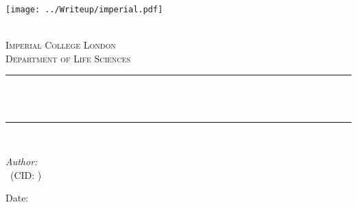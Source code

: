 \begin{titlepage}

    \newcommand{\HRule}{\rule{\linewidth}{0.5mm}} %
    
    
    \texttt{[image: ../Writeup/imperial.pdf]}\\[0.6cm] 
    
    \begin{center} %
    
    \textsc{\LARGE \reporttype}\\[1.5cm] 
    \textsc{\Large Imperial College London}\\[0.5cm] 
    \textsc{\large Department of Life Sciences}\\[0.5cm] 
    
    \HRule \\[0.4cm]
    { \huge \bfseries \reporttitle}\\ %
    \HRule \\[1.5cm]
    \end{center}
    
    \begin{flushleft} \large
    \textit{Author:}\\
    \reportauthor~(CID: \cid) %

    \vspace{2cm}
    \makeatletter
    Date: \@date \\
    \end{flushleft}


    \vfill %
    

    
    \makeatother
    
    


    \end{titlepage}